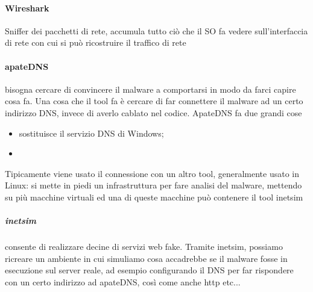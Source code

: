 \documentclass[12pt, oneside]{extbook}
\begin{document}
\paragraph{Wireshark} Sniffer dei pacchetti di rete, accumula tutto ciò che il SO fa vedere sull'interfaccia di rete con cui si può ricostruire il traffico di rete
\\
\paragraph{apateDNS} bisogna cercare di convincere il malware a comportarsi in modo da farci capire cosa fa. Una cosa che il tool fa è cercare di far connettere il malware ad un certo indirizzo DNS, invece di averlo cablato nel codice. ApateDNS fa due grandi cose
\begin{itemize}
\item sostituisce il servizio DNS di Windows;
\item 
\end{itemize} 
Tipicamente viene usato il connessione con un altro tool, generalmente usato in Linux: si mette in piedi un infrastruttura per fare analisi del malware, mettendo su più macchine virtuali ed una di queste macchine può contenere il tool inetsim
\subparagraph{inetsim} consente di realizzare decine di servizi web fake. Tramite inetsim, possiamo ricreare un ambiente in cui simuliamo cosa accadrebbe se il malware fosse in esecuzione sul server reale, ad esempio configurando il DNS per far rispondere con un certo indirizzo ad apateDNS, così come anche http etc...
\end{document}

